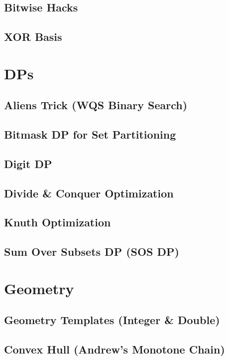 \subsection{Bitwise Hacks}

\subsection{XOR Basis}

\section{DPs}
\subsection{Aliens Trick (WQS Binary Search)}

\subsection{Bitmask DP for Set Partitioning}

\subsection{Digit DP}

\subsection{Divide \& Conquer Optimization}

\subsection{Knuth Optimization}

\subsection{Sum Over Subsets DP (SOS DP)}

\section{Geometry}
\subsection{Geometry Templates (Integer \& Double)}

\subsection{Convex Hull (Andrew's Monotone Chain)}

